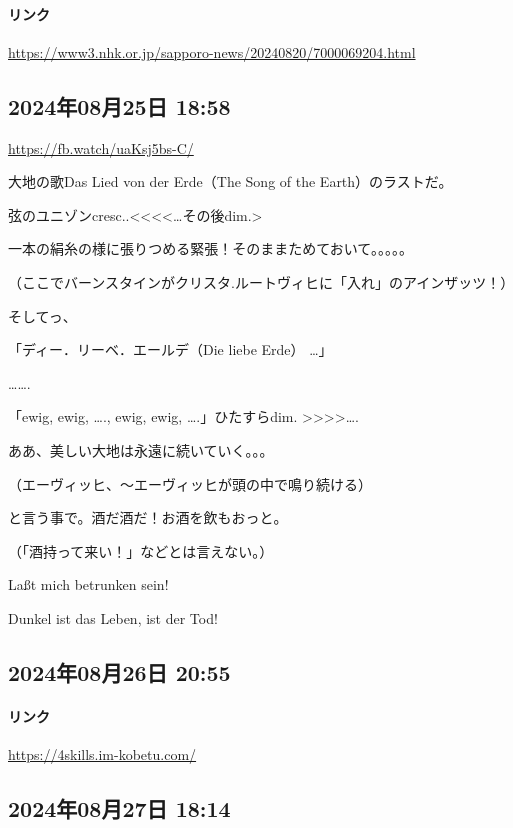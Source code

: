 \documentclass[facebook_diary.tex]{subfiles}
\begin{document}
\paragraph{リンク}
\url{https://www3.nhk.or.jp/sapporo-news/20240820/7000069204.html}

\subsection*{2024年08月25日 18:58}

\url{https://fb.watch/uaKsj5bs-C/}




大地の歌Das Lied von der Erde（The Song of the Earth）のラストだ。


弦のユニゾンcresc..<<<<…その後dim.>

一本の絹糸の様に張りつめる緊張！そのままためておいて。。。。。

（ここでバーンスタインがクリスタ.ルートヴィヒに「入れ」のアインザッツ！）

そしてっ、


「ディー．リーベ．エールデ（Die liebe Erde） …」

…….

「ewig, ewig, …., ewig, ewig, ….」ひたすらdim. >>>>….


ああ、美しい大地は永遠に続いていく。。。

（エーヴィッヒ、〜エーヴィッヒが頭の中で鳴り続ける）


と言う事で。酒だ酒だ！お酒を飲もおっと。

（「酒持って来い！」などとは言えない。）

Laßt mich betrunken sein!

Dunkel ist das Leben, ist der Tod!

\subsection*{2024年08月26日 20:55}

\paragraph{リンク}
\url{https://4skills.im-kobetu.com/}

\subsection*{2024年08月27日 18:14}
\end{document}
